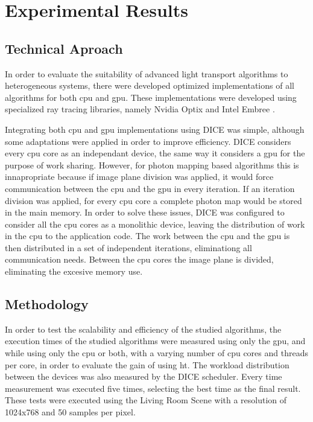 \chapter{Experimental Results}

\section{Technical Aproach}

In order to evaluate the suitability of advanced light transport algorithms to heterogeneous systems, there were developed optimized implementations of all algorithms for both \gls{cpu} and \gls{gpu}. These implementations were developed using specialized ray tracing libraries, namely Nvidia Optix \citep{parker2010optix} and Intel Embree \citep{wald2014embree}.

Integrating both \gls{cpu} and \gls{gpu} implementations using DICE was simple, although some adaptations were applied in order to improve efficiency. DICE considers every \gls{cpu} core as an independant device, the same way it considers a \gls{gpu} for the purpose of work sharing. However, for photon mapping based algorithms this is innapropriate because if image plane division was applied, it would force communication between the \gls{cpu} and the \gls{gpu} in every iteration. If an iteration division was applied, for every \gls{cpu} core a complete photon map would be stored in the main memory. In order to solve these issues, DICE was configured to consider all the \gls{cpu} cores as a monolithic device, leaving the distribution of work in the \gls{cpu} to the application code. The work between the \gls{cpu} and the \gls{gpu} is then distributed in a set of independent iterations, eliminationg all communication needs. Between the \gls{cpu} cores the image plane is divided, eliminating the excesive memory use.

\section{Methodology}

In order to test the scalability and efficiency of the studied algorithms, the execution times of the studied algorithms were measured using only the \gls{gpu}, and while using only the \gls{cpu} or both, with a varying number of \gls{cpu} cores and threads per core, in order to evaluate the gain of using \gls{ht}. The workload distribution between the devices was also measured by the DICE scheduler. Every time measurement was executed five times, selecting the best time as the final result. These tests were executed using the Living Room Scene with a resolution of 1024x768 and 50 samples per pixel.

